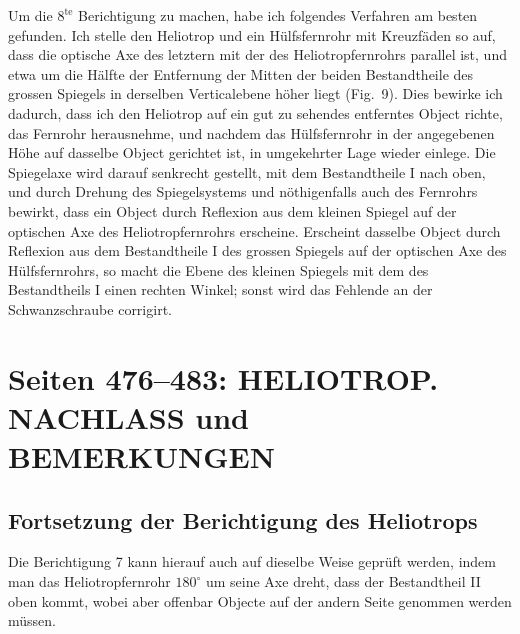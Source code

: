 \documentclass[12pt,a4paper]{article}
\theoremstyle{plain}
\theoremstyle{definition}
\theoremstyle{remark}
\begin{document}
Um die $8^{\text{te}}$ Berichtigung zu machen, habe ich folgendes Verfahren am besten gefunden. Ich stelle den Heliotrop und ein H\"ulfsfernrohr mit Kreuzf\"aden so auf, dass die optische Axe des letztern mit der des Heliotropfernrohrs parallel ist, und etwa um die H\"alfte der Entfernung der Mitten der beiden Bestandtheile des grossen Spiegels in derselben Verticalebene h\"oher liegt (Fig.~9). Dies bewirke ich dadurch, dass ich den Heliotrop auf ein gut zu sehendes entferntes Object richte, das Fernrohr herausnehme, und nachdem das H\"ulfsfernrohr in der angegebenen H\"ohe auf dasselbe Object gerichtet ist, in umgekehrter Lage wieder einlege. Die Spiegelaxe wird darauf senkrecht gestellt, mit dem Bestandtheile I nach oben, und durch Drehung des Spiegelsystems und n\"othigenfalls auch des Fernrohrs bewirkt, dass ein Object durch Reflexion aus dem kleinen Spiegel auf der optischen Axe des Heliotropfernrohrs erscheine. Erscheint dasselbe Object durch Reflexion aus dem Bestandtheile I des grossen Spiegels auf der optischen Axe des H\"ulfsfernrohrs, so macht die Ebene des kleinen Spiegels mit dem des Bestandtheils I einen rechten Winkel; sonst wird das Fehlende an der Schwanzschraube corrigirt.

\vfill
\eject


\section*{Seiten 476--483: HELIOTROP. NACHLASS und BEMERKUNGEN}

\subsection*{Fortsetzung der Berichtigung des Heliotrops}

Die Berichtigung 7 kann hierauf auch auf dieselbe Weise gepr\"uft werden, indem man das Heliotropfernrohr $180^{\circ}$ um seine Axe dreht, dass der Bestandtheil II oben kommt, wobei aber offenbar Objecte auf der andern Seite genommen werden m\"ussen.
\end{document}
